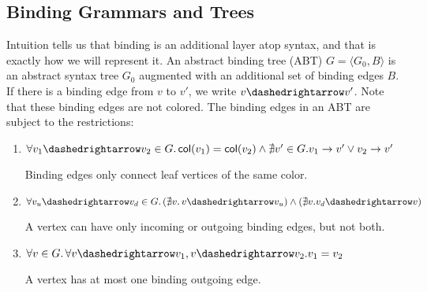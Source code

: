 \documentclass[11pt]{article} %
\theoremstyle{definition}
\begin{document}
\subsection{Binding Grammars and Trees}

Intuition tells us that binding is an additional layer atop syntax, and that is exactly how we will represent it.
An abstract binding tree (ABT) $G = \langle G_0, B \rangle$ is an abstract syntax tree $G_0$ augmented with an additional set of binding edges $B$.
If there is a binding edge from $v$ to $v'$, we write $v \dashedrightarrow v'$.
Note that these binding edges are not colored.
The binding edges in an ABT are subject to the restrictions:
\begin{enumerate}
    \item $\forall v_1 \dashedrightarrow v_2 \in G.\,
            \mathsf{col}(v_1) = \mathsf{col}(v_2) \land
            \nexists v' \in G. v_1 \to v' \lor v_2 \to v'$

            Binding edges only connect leaf vertices of the same color.
    \item $\forall v_u \dashedrightarrow v_d \in G.\,
            (\nexists v.\, v \dashedrightarrow v_u) \land
            (\nexists v. v_d \dashedrightarrow v)$

            A vertex can have only incoming or outgoing binding edges, but not both.

    \item $\forall v \in G.\,
            \forall v \dashedrightarrow v_1, v \dashedrightarrow v_2.
            v_1 = v_2$

            A vertex has at most one binding outgoing edge.
\end{enumerate}
\end{document}

